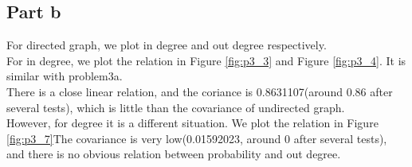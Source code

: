 \documentclass{article}
\begin{document}
\subsection{Part b}
For directed graph, we plot in degree and out degree respectively. \\
For in degree, we plot the relation in Figure \ref{fig:p3_3} and 
Figure \ref{fig:p3_4}. It is similar with problem3a. \\
There is a close linear relation, and the coriance is 0.8631107(around 0.86 after several tests), which is little than the covariance of undirected graph.\\
However, for degree it is a different situation. We plot the relation in Figure \ref{fig:p3_7}The covariance is very low(0.01592023, around 0 after several tests), and there is no obvious relation between probability and out degree.\\
\end{document}
